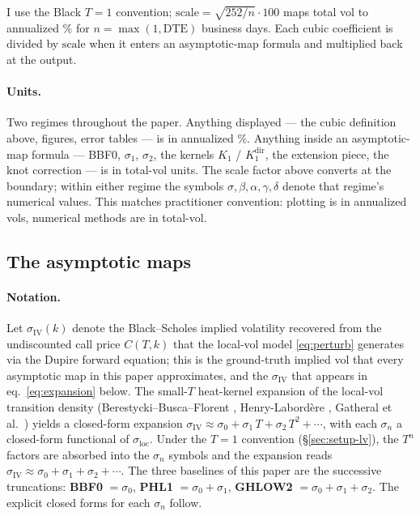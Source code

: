 \documentclass[11pt]{article}
\newcommand{\sloc}{\sigma_{\mathrm{loc}}}
\newcommand{\siv}{\sigma_{\mathrm{IV}}}
\begin{document}
I use the Black $T=1$ convention; $\mathrm{scale}=\sqrt{252/n}\cdot 100$
maps total vol to annualized \% for $n=\max(1,\mathrm{DTE})$ business
days. Each cubic coefficient is divided by $\mathrm{scale}$ when it
enters an asymptotic-map formula and multiplied back at the output.

\paragraph{Units.} Two regimes throughout the paper. Anything displayed
--- the cubic definition above, figures, error tables --- is in
annualized \%. Anything inside an asymptotic-map formula --- BBF0,
$\sigma_1$, $\sigma_2$, the kernels $K_1$ / $K_1^{\mathrm{dir}}$, the
extension piece, the knot correction --- is in total-vol units.
The scale factor above converts at the boundary; within either regime
the symbols $\sigma,\beta,\alpha,\gamma,\delta$ denote that regime's
numerical values. This matches practitioner convention: plotting is in
annualized vols, numerical methods are in total-vol.

\subsection{The asymptotic maps}\label{sec:setup-maps}

\paragraph{Notation.} Let $\siv(k)$ denote the Black--Scholes implied
volatility recovered from the undiscounted call price $C(T,k)$ that
the local-vol model \eqref{eq:perturb} generates via the Dupire
forward equation; this is the ground-truth implied vol that every
asymptotic map in this paper approximates, and the $\siv$ that
appears in eq.~\eqref{eq:expansion} below. The small-$T$ heat-kernel
expansion of the local-vol transition density
(Berestycki--Busca--Florent \citep{berestycki2002},
Henry-Labord\`ere \citep{henrylabordere2008}, Gatheral et al.\
\citep{gatheral2012}) yields a closed-form expansion $\siv \approx
\sigma_0 + \sigma_1\,T + \sigma_2\,T^{2} + \cdots$, with each
$\sigma_n$ a closed-form functional of $\sloc$. Under the $T=1$
convention (\S\ref{sec:setup-lv}), the $T^{n}$ factors are absorbed
into the $\sigma_n$ symbols and the expansion reads $\siv \approx
\sigma_0 + \sigma_1 + \sigma_2 + \cdots$. The three baselines of this
paper are the successive truncations:
\textbf{BBF0} $=\sigma_0$,
\textbf{PHL1} $=\sigma_0+\sigma_1$,
\textbf{GHLOW2} $=\sigma_0+\sigma_1+\sigma_2$.
The explicit closed forms for each $\sigma_n$ follow.
\end{document}
